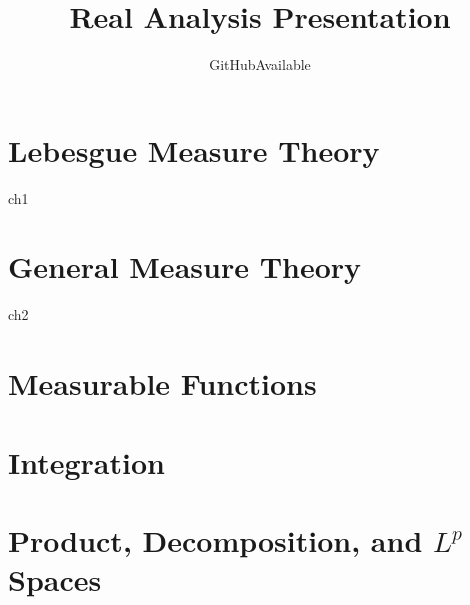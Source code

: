 \documentclass[openany]{book}
\title{Real Analysis Presentation}
\author{GitHubAvailable}
\begin{document}

\frontmatter  %

{
    \hypersetup{linkcolor=blue}
    \tableofcontents
}

\mainmatter  %

\chapter{Lebesgue Measure Theory}
{ch1}

\chapter{General Measure Theory}
{ch2}

\chapter{Measurable Functions}

\chapter{Integration}

\chapter{Product, Decomposition, and $L^p$ Spaces}
\end{document}
